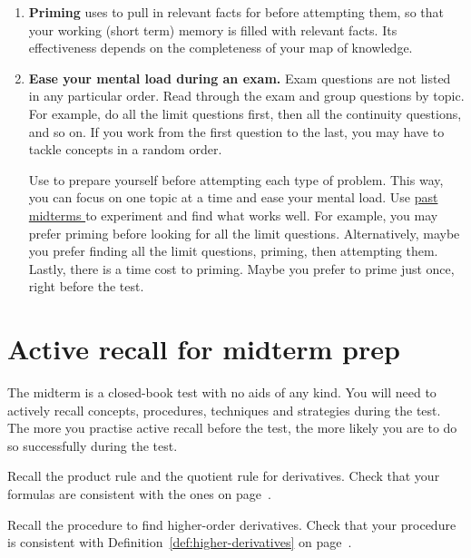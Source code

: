 \documentclass[../main.tex]{subfiles}
\begin{document}
\begin{enumerate}
  \item \textbf{Priming} uses  to pull in relevant facts for  before attempting them, so that your working (short term) memory is filled with relevant facts. Its effectiveness depends on the completeness of your map of knowledge.

  \item \textbf{Ease your mental load during an exam.} Exam questions are not listed in any particular order. Read through the exam and group questions by topic. For example, do all the limit questions first, then all the continuity questions, and so on. If you work from the first question to the last, you may have to tackle concepts in a random order.

    Use  to prepare yourself before attempting each type of problem. This way, you can focus on one topic at a time and ease your mental load. Use \href{https://westernu.brightspace.com/d2l/le/lessons/201580/units/3922747}{\color{link} past midterms \footnotesize\faExternalLink*} to experiment and find what works well. For example, you may prefer priming before looking for all the limit questions. Alternatively, maybe you prefer finding all the limit questions, priming, then attempting them. Lastly, there is a time cost to priming. Maybe you prefer to prime just once, right before the test.
\end{enumerate}

\section{Active recall for midterm prep}

The midterm is a closed-book test with no aids of any kind. You will need to actively recall concepts, procedures, techniques and strategies during the test. The more you practise active recall before the test, the more likely you are to do so successfully during the test.

\begin{exercise}
  Recall the product rule and the quotient rule for derivatives. Check that your formulas are consistent with the ones on page~\pageref{thm:diff-rules-2}.
\end{exercise}

\begin{exercise}
  Recall the procedure to find higher-order derivatives.
  Check that your procedure is consistent with Definition~\ref{def:higher-derivatives} on page~\pageref{def:higher-derivatives}.
\end{exercise}
\end{document}
